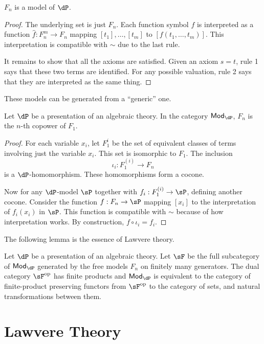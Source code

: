 \documentclass{amsart}
\begin{document}
\begin{lem}
  $F_{n}$ is a model of $\dP$.
\end{lem}
\begin{proof}
  The underlying set is just $F_{n}$.
  Each function symbol $f$ is interpreted as a function $\hat{f} : F_{n}^{m} \to F_{n}$ mapping $[t_{1}],\ldots,[t_{m}]$ to $[f(t_{1},\ldots,t_{m})]$.
  This interpretation is compatible with $\sim$ due to the last rule.

  It remains to show that all the axioms are satisfied.
  Given an axiom $s = t$, rule 1 says that these two terms are identified.
  For any possible valuation, rule 2 says that they are interpreted as the same thing.
\end{proof}

These models can be generated from a ``generic'' one.
\begin{lem}
  Let $\dP$ be a presentation of an algebraic theory.
  In the category $\mathsf{Mod}_{\dP}$, $F_{n}$ is the $n$-th copower of $F_{1}$.
\end{lem}
\begin{proof}
  For each variable $x_{i}$, let $F^{i}_{1}$ be the set of equivalent classes of terms involving just the variable $x_{i}$.
  This set is isomorphic to $F_{1}$.
  The inclusion
  \[
    \iota_{i} : F^{(i)}_{1} \to F_{n}
  \]
  is a $\dP$-homomorphism.
  These homomorphisms form a cocone.

  Now for any $\dP$-model $\sP$ together with $f_{i} : F^{(i)}_{1} \to \sP$, defining another cocone.
  Consider the function $f : F_{n} \to \sP$ mapping $[x_{i}]$ to the interpretation of $f_{i}(x_{i})$ in $\sP$.
  This function is compatible with $\sim$ because of how interpretation works.
  By construction, $f \circ \iota_{i} = f_{i}$.
\end{proof}

The following lemma is the essence of Lawvere theory.
\begin{lem}
  Let $\dP$ be a presentation of an algebraic theory.
  Let $\sF$ be the full subcategory of $\mathsf{Mod}_{\dP}$ generated by the free models $F_{n}$ on finitely many generators.
  The dual category $\sF\op$ has finite products and $\mathsf{Mod}_{\dP}$ is equivalent to the category of finite-product preserving functors from $\sF\op$ to the category of sets,
  and natural transformations between them.
\end{lem}

\section{Lawvere Theory}
\label{sec:lawvere-theory}
\end{document}
